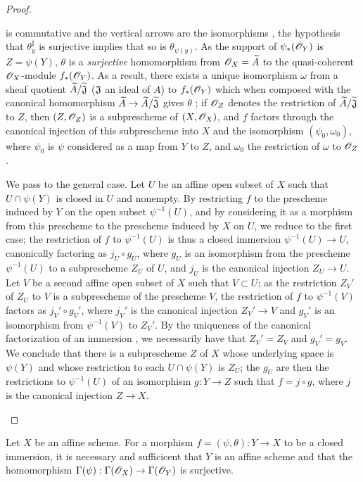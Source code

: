 \begin{proof}
\begin{enumerate}[label=(\alph*)]
\[{      }
    \]
    is commutative and the vertical arrows are the isomorphisms , the hypothesis that $\theta_y^\sharp$ is surjective implies that so is $\theta_{\psi(y)}$.
    As the support of $\psi_*(\mathscr{O}_Y)$ is $Z=\psi(Y)$, $\theta$ is a \emph{surjective} homomorphism from $\mathscr{O}_X={\widetilde{A}}$ to the quasi-coherent $\mathscr{O}_X$-module $f_*(\mathscr{O}_Y)$.
    As a result, there exists a unique isomorphism $\omega$ from a sheaf quotient ${\widetilde{A}}/{\widetilde{\mathfrak{J}}}$ ($\mathfrak{J}$ an ideal of $A$) to $f_*(\mathscr{O}_Y)$ which when composed with the canonical homomorphism $\wt{A}\to\wt{A}/\wt{\fk{J}}$ gives $\theta$ ; if $\mathscr{O}_Z$ denotes the restriction of ${\widetilde{A}}/{\widetilde{\mathfrak{J}}}$ to $Z$, then $(Z,\mathscr{O}_Z)$ is a subprescheme of $(X,\mathscr{O}_X)$, and $f$ factors through the canonical injection of this subprescheme into $X$ and the isomorphism $(\psi_0,\omega_0)$, where $\psi_0$ is $\psi$ considered as a map from $Y$ to $Z$, and $\omega_0$ the restriction of $\omega$ to $\mathscr{O}_Z$.

    We pass to the general case.
    Let $U$ be an affine open subset of $X$ such that $U\cap\psi(Y)$ is closed in $U$ and nonempty.
    By restricting $f$ to the prescheme induced by $Y$ on the open subset $\psi^{-1}(U)$, and by considering it as a morphism from this prescheme to the prescheme induced by $X$ on $U$, we reduce to the first case; the restriction of $f$ to $\psi^{-1}(U)$ is thus a closed immersion $\psi^{-1}(U)\to U$, canonically factoring as $j_U\circ g_U$, where $g_U$ is an isomorphism from the prescheme $\psi^{-1}(U)$ to a subprescheme $Z_U$ of $U$, and $j_U$ is the canonical injection $Z_U\to U$.
    Let $V$ be a second affine open subset of $X$ such that $V\subset U$; as the restriction $Z_V'$ of $Z_U$ to $V$ is a subprescheme of the prescheme $V$, the restriction of $f$ to $\psi^{-1}(V)$ factors as $j_V'\circ g_V'$, where $j_V'$ is the canonical injection $Z_V'\to V$ and $g_V'$ is an isomorphism from $\psi^{-1}(V)$ to $Z_V'$.
    By the uniqueness of the canonical factorization of an immersion , we necessarily have that $Z_V'=Z_V$ and $g_V'=g_V$.
    We conclude  that there is a subprescheme $Z$ of $X$ whose underlying space is $\psi(Y)$ and whose restriction to each $U\cap\psi(Y)$ is $Z_U$; the $g_U$ are then the restrictions to $\psi^{-1}(U)$ of an isomorphism $g:Y\to Z$ such that $f=j\circ g$, where $j$ is the canonical injection $Z\to X$.
\end{enumerate}
\end{proof}

\begin{cor}[4.2.3]
\label{1.4.2.3}
Let $X$ be an affine scheme.
For a morphism $f=(\psi,\theta):Y\to X$ to be a closed immersion, it is necessary and sufficicent that $Y$ is an affine scheme and that the homomorphism $\Gamma(\psi):\Gamma(\OO_X)\to\Gamma(\OO_Y)$ is surjective.
\end{cor}

